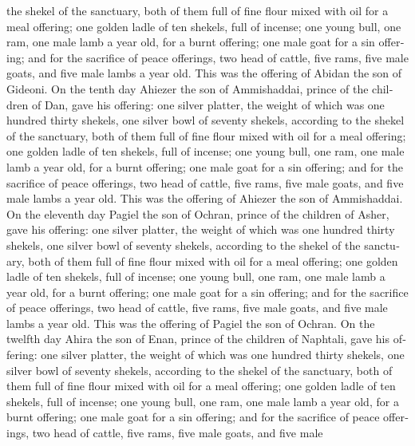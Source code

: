 \begin{paracol}{2}
\begin{otherlanguage}{english}
the shekel of the sanctuary, both of them full of fine flour mixed with
oil for a meal offering;  one golden ladle of ten
shekels, full of incense;  one young bull, one ram, one
male lamb a year old, for a burnt offering;  one male
goat for a sin offering;  and for the sacrifice of peace
offerings, two head of cattle, five rams, five male goats, and five male
lambs a year old. This was the offering of Abidan the son of Gideoni.
 On the tenth day Ahiezer the son of Ammishaddai, prince
of the children of Dan,  gave his offering: one silver
platter, the weight of which was one hundred thirty shekels, one silver
bowl of seventy shekels, according to the shekel of the sanctuary, both
of them full of fine flour mixed with oil for a meal offering;
 one golden ladle of ten shekels, full of incense;
 one young bull, one ram, one male lamb a year old, for a
burnt offering;  one male goat for a sin offering;
 and for the sacrifice of peace offerings, two head of
cattle, five rams, five male goats, and five male lambs a year old. This
was the offering of Ahiezer the son of Ammishaddai.  On
the eleventh day Pagiel the son of Ochran, prince of the children of
Asher,  gave his offering: one silver platter, the weight
of which was one hundred thirty shekels, one silver bowl of seventy
shekels, according to the shekel of the sanctuary, both of them full of
fine flour mixed with oil for a meal offering;  one
golden ladle of ten shekels, full of incense;  one young
bull, one ram, one male lamb a year old, for a burnt offering;
 one male goat for a sin offering;  and
for the sacrifice of peace offerings, two head of cattle, five rams,
five male goats, and five male lambs a year old. This was the offering
of Pagiel the son of Ochran.  On the twelfth day Ahira
the son of Enan, prince of the children of Naphtali, 
gave his offering: one silver platter, the weight of which was one
hundred thirty shekels, one silver bowl of seventy shekels, according to
the shekel of the sanctuary, both of them full of fine flour mixed with
oil for a meal offering;  one golden ladle of ten
shekels, full of incense;  one young bull, one ram, one
male lamb a year old, for a burnt offering;  one male
goat for a sin offering;  and for the sacrifice of peace
offerings, two head of cattle, five rams, five male goats, and five male

\end{otherlanguage}
\end{paracol}
